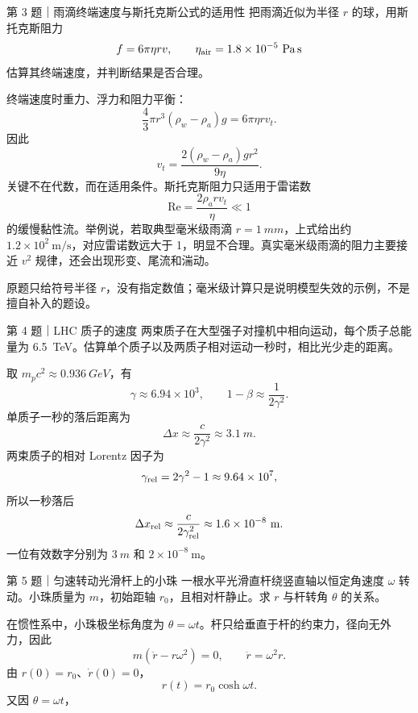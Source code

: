 \begin{problem}{第 3 题｜雨滴终端速度与斯托克斯公式的适用性}
把雨滴近似为半径 $r$ 的球，用斯托克斯阻力
\[
f=6\pi\eta rv,
\qquad \eta_{\rm air}=1.8\times10^{-5}\ \mathrm{Pa\,s}
\]
估算其终端速度，并判断结果是否合理。
\end{problem}
\begin{solution}
终端速度时重力、浮力和阻力平衡：
\[
\frac43\pi r^3(\rho_w-\rho_a)g=6\pi\eta rv_t.
\]
因此
\[
\boxed{v_t=\frac{2(\rho_w-\rho_a)gr^2}{9\eta}}.
\]
关键不在代数，而在适用条件。斯托克斯阻力只适用于雷诺数
\[
\mathrm{Re}=\frac{2\rho_a rv_t}{\eta}\ll1
\]
的缓慢黏性流。举例说，若取典型毫米级雨滴 $r=\SI{1}{mm}$，上式给出约 $1.2\times10^2\ \mathrm{m/s}$，对应雷诺数远大于 1，明显不合理。真实毫米级雨滴的阻力主要接近 $v^2$ 规律，还会出现形变、尾流和湍动。
\begin{selfcheck}
原题只给符号半径 $r$，没有指定数值；毫米级计算只是说明模型失效的示例，不是擅自补入的题设。
\end{selfcheck}
\end{solution}

\begin{problem}{第 4 题｜LHC 质子的速度}
两束质子在大型强子对撞机中相向运动，每个质子总能量为 \SI{6.5}{TeV}。估算单个质子以及两质子相对运动一秒时，相比光少走的距离。
\end{problem}
\begin{solution}
取 $m_pc^2\approx\SI{0.936}{GeV}$，有
\[
\gamma\approx6.94\times10^3,
\qquad 1-\beta\approx\frac1{2\gamma^2}.
\]
单质子一秒的落后距离为
\[
\Delta x\approx\frac{c}{2\gamma^2}\approx\SI{3.1}{m}.
\]
两束质子的相对 Lorentz 因子为
\[
\gamma_{\rm rel}=2\gamma^2-1\approx9.64\times10^7,
\]
所以一秒落后
\[
\Delta x_{\rm rel}\approx\frac{c}{2\gamma_{\rm rel}^2}
\approx1.6\times10^{-8}\ \mathrm m.
\]
一位有效数字分别为 $\SI{3}{m}$ 和 $2\times10^{-8}\ \mathrm m$。
\end{solution}

\begin{problem}{第 5 题｜匀速转动光滑杆上的小珠}
一根水平光滑直杆绕竖直轴以恒定角速度 $\omega$ 转动。小珠质量为 $m$，初始距轴 $r_0$，且相对杆静止。求 $r$ 与杆转角 $\theta$ 的关系。
\FigRotatingRodBead
\end{problem}
\begin{solution}
在惯性系中，小珠极坐标角度为 $\theta=\omega t$。杆只给垂直于杆的约束力，径向无外力，因此
\[
m(\ddot r-r\omega^2)=0,
\qquad \ddot r=\omega^2r.
\]
由 $r(0)=r_0$、$\dot r(0)=0$，
\[
r(t)=r_0\cosh\omega t.
\]
又因 $\theta=\omega t$，
\end{solution}


